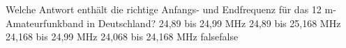     {Welche Antwort enthält die richtige Anfangs- und Endfrequenz für das 12 m-Amateurfunkband in Deutschland?}
    {24,89 bis 24,99 MHz}
    {24,89 bis 25,168 MHz}
    {24,168 bis 24,99 MHz}
    {24,068 bis 24,168 MHz}
    {false}{false}